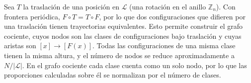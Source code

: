 Sea $T$ la traslación de una posición en $\mathcal{L}$ (una rotación en el anillo $\mathbb{Z}_n$). Con frontera periódica, $F \circ T = T \circ F$, por lo que dos configuraciones que difieren por una traslación tienen trayectorias equivalentes. Esto permite construir el grafo cociente, cuyos nodos son las clases de configuraciones bajo traslación y cuyas aristas son $[x] \to [F(x)]$. Todas las configuraciones de una misma clase tienen la misma altura, y el número de nodos se reduce aproximadamente a $N/|\mathcal{L}|$. En el grafo cociente cada clase cuenta como un solo nodo, por lo que las proporciones calculadas sobre él se normalizan por el número de clases.
